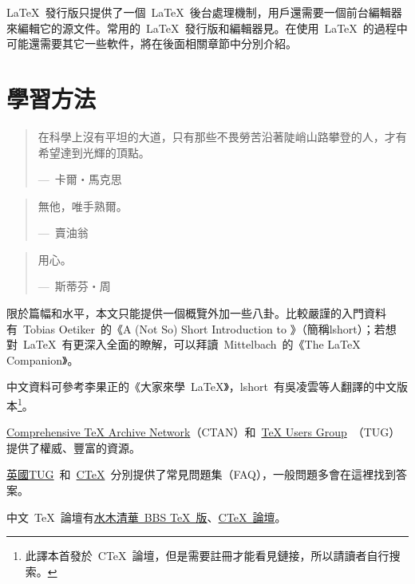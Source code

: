 \LaTeX~發行版只提供了一個~\LaTeX~後台處理機制，用戶還需要一個前台編輯器來編輯它的源文件。常用的~\LaTeX~發行版和編輯器見。在使用~\LaTeX~的過程中可能還需要其它一些軟件，將在後面相關章節中分別介紹。

\section{學習方法}
\begin{quotation}
在科學上沒有平坦的大道，只有那些不畏勞苦沿著陡峭山路攀登的人，才有希望達到光輝的頂點。
\begin{flushright}
---~卡爾‧馬克思
\end{flushright}
\end{quotation}

\begin{quotation}
無他，唯手熟爾。
\begin{flushright}
---~賣油翁
\end{flushright}
\end{quotation}

\begin{quotation}
用心。
\begin{flushright}
---~斯蒂芬‧周
\end{flushright}
\end{quotation}

限於篇幅和水平，本文只能提供一個概覽外加一些八卦。比較嚴謹的入門資料有~Tobias Oetiker~的《A (Not So) Short Introduction to \LaTeXe》\citep{Oetiker_2008}（簡稱lshort）；若想對~\LaTeX~有更深入全面的瞭解，可以拜讀~Mittelbach~的《The \LaTeX~ Companion》\citep{Mittelbach_2004}。

中文資料可參考李果正的《大家來學~\LaTeX》\citep{Lee_2004}，lshort~有吳凌雲等人翻譯的中文版本\footnote{此譯本首發於~CTeX~論壇，但是需要註冊才能看見鏈接，所以請讀者自行搜索。}。

\href{http://www.ctan.org/}{Comprehensive TeX Archive Network}（CTAN）和~\href{http://www.tug.org/}{TeX Users Group}~（TUG）提供了權威、豐富的資源。

\href{http://www.text.ac.uk/}{英國TUG}~和~\href{http://www.ctex.org}{CTeX}~分別提供了常見問題集（FAQ）\citep{UKTUG_FAQ,CTeX_FAQ}，一般問題多會在這裡找到答案。

中文~\TeX~論壇有\href{http://www.smth.org/bbsdoc.php?board=TeX}{水木清華~BBS TeX~版}、\href{http://bbs.ctex.org/}{CTeX~論壇}。



\newpage

